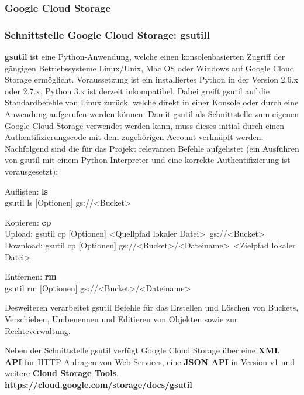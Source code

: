 \documentclass[12pt,a4paper,bibliography=totocnumbered,listof=totocnumbered]{scrartcl}
\begin{document}
\subsubsection{Google Cloud Storage}

\subsubsection{Schnittstelle Google Cloud Storage: gsutill}
\textbf{gsutil} ist eine Python-Anwendung, welche einen konsolenbasierten Zugriff der gängigen Betriebssysteme Linux/Unix, Mac OS oder Windows auf Google Cloud Storage ermöglicht. Voraussetzung ist ein installiertes Python in der Version 2.6.x oder 2.7.x,  Python 3.x ist derzeit inkompatibel. Dabei greift gsutil auf die Standardbefehle von Linux zurück, welche direkt in einer Konsole oder durch eine Anwendung aufgerufen werden können. Damit gsutil als Schnittstelle zum eigenen Google Cloud Storage verwendet werden kann, muss dieses initial durch einen Authentifizierungscode mit dem zugehörigen Account verknüpft werden. Nachfolgend sind die für das Projekt relevanten Befehle aufgelistet (ein Ausführen von gsutil mit einem Python-Interpreter und eine korrekte Authentifizierung ist vorausgesetzt):

\begin{compactitem}
	\item Auflisten: \textbf{ls}\\
	gsutil ls [Optionen] gs://\textless Bucket\textgreater
	\item Kopieren: \textbf{cp}\\
	Upload: gsutil cp [Optionen] \textless Quellpfad lokaler Datei\textgreater~gs://\textless Bucket\textgreater\\
	Download:  gsutil cp [Optionen] gs://\textless Bucket\textgreater/\textless Dateiname\textgreater~\textless Zielpfad lokaler Datei\textgreater
	\item Entfernen: \textbf{rm}\\
	gsutil rm [Optionen] gs://\textless Bucket\textgreater /\textless Dateiname\textgreater
\end{compactitem}

Desweiteren verarbeitet gsutil Befehle für das Erstellen und Löschen von Buckets, Verschieben, Umbenennen und Editieren von Objekten sowie zur Rechteverwaltung.

Neben der Schnittstelle gsutil verfügt Google Cloud Storage über eine \textbf{XML API} für HTTP-Anfragen von Web-Services, eine \textbf{JSON API} in Version v1 und weitere \textbf{Cloud Storage Tools}.\\
\textbf{\url{https://cloud.google.com/storage/docs/gsutil}}
\end{document}
